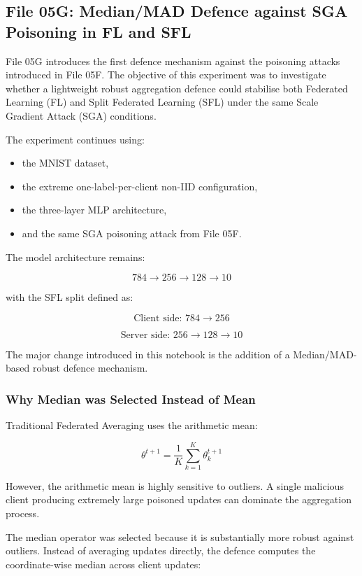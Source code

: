 \subsection*{File 05G: Median/MAD Defence against SGA Poisoning in FL and SFL}

File 05G introduces the first defence mechanism against the poisoning attacks introduced in File 05F. The objective of this experiment was to investigate whether a lightweight robust aggregation defence could stabilise both Federated Learning (FL) and Split Federated Learning (SFL) under the same Scale Gradient Attack (SGA) conditions.

The experiment continues using:
\begin{itemize}
    \item the MNIST dataset,
    \item the extreme one-label-per-client non-IID configuration,
    \item the three-layer MLP architecture,
    \item and the same SGA poisoning attack from File 05F.
\end{itemize}

The model architecture remains:

\[
784 \rightarrow 256 \rightarrow 128 \rightarrow 10
\]

with the SFL split defined as:

\[
\text{Client side: } 784 \rightarrow 256
\]

\[
\text{Server side: } 256 \rightarrow 128 \rightarrow 10
\]

The major change introduced in this notebook is the addition of a Median/MAD-based robust defence mechanism.

\subsubsection*{Why Median was Selected Instead of Mean}

Traditional Federated Averaging uses the arithmetic mean:

\[
\theta^{t+1}
=
\frac{1}{K}
\sum_{k=1}^{K}
\theta_k^{t+1}
\]

However, the arithmetic mean is highly sensitive to outliers. A single malicious client producing extremely large poisoned updates can dominate the aggregation process.

The median operator was selected because it is substantially more robust against outliers. Instead of averaging updates directly, the defence computes the coordinate-wise median across client updates:

